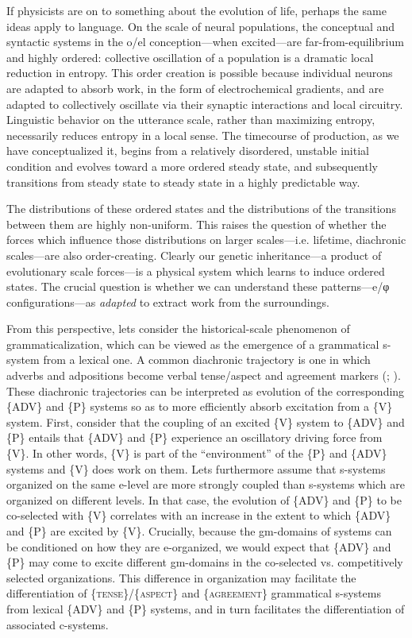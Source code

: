   If physicists are on to something about the evolution of life, perhaps the same ideas apply to language. On the scale of neural populations, the conceptual and syntactic systems in the o/el conception—when excited—are far-from-equilibrium and highly ordered: collective oscillation of a population is a dramatic local reduction in entropy. This order creation is possible because individual neurons are adapted to absorb work, in the form of electrochemical gradients, and are adapted to collectively oscillate via their synaptic interactions and local circuitry. Linguistic behavior on the utterance scale, rather than maximizing entropy, necessarily reduces entropy in a local sense. The timecourse of production, as we have conceptualized it, begins from a relatively disordered, unstable initial condition and evolves toward a more ordered steady state, and subsequently transitions from steady state to steady state in a highly predictable way. 

  The distributions of these ordered states and the distributions of the transitions between them are highly non-uniform. This raises the question of whether the forces which influence those distributions on larger scales—i.e. lifetime, diachronic scales—are also order-creating. Clearly our genetic inheritance—a product of evolutionary scale forces—is a physical system which learns to induce ordered states. The crucial question is whether we can understand these patterns—e/φ configurations—as \textit{adapted} to extract work from the surroundings.

  From this perspective, lets consider the historical-scale phenomenon of grammaticalization, which can be viewed as the emergence of a grammatical s-system from a lexical one. A common diachronic trajectory is one in which adverbs and adpositions become verbal tense/aspect and agreement markers (\citealt{HeineKuteva2002}; \citealt{TraugottHeine1991}). These diachronic trajectories can be interpreted as evolution of the corresponding \{ADV\} and \{P\} systems so as to more efficiently absorb excitation from a \{V\} system. First, consider that the coupling of an excited \{V\} system to \{ADV\} and \{P\} entails that \{ADV\} and \{P\} experience an oscillatory driving force from \{V\}. In other words, \{V\} is part of the “environment” of the \{P\} and \{ADV\} systems and \{V\} does work on them. Lets furthermore assume that s-systems organized on the same e-level are more strongly coupled than s-systems which are organized on different levels. In that case, the evolution of \{ADV\} and \{P\} to be co-selected with \{V\} correlates with an increase in the extent to which \{ADV\} and \{P\} are excited by \{V\}. Crucially, because the gm-domains of systems can be conditioned on how they are e-organized, we would expect that \{ADV\} and \{P\} may come to excite different gm-domains in the co-selected vs. competitively selected organizations. This difference in organization may facilitate the differentiation of \{\textsc{tense}\}/\{\textsc{aspect}\} and \{\textsc{agreement}\} grammatical s-systems from lexical \{ADV\} and \{P\} systems, and in turn facilitates the differentiation of associated c-systems. 

